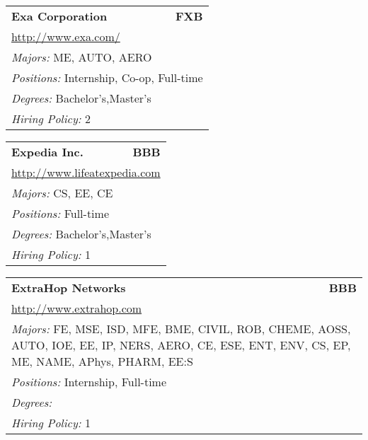 \documentclass[twoside]{article}
\begin{document}
\begin{center}
\begin{multicols}{3}
\begin{FlushLeft}
\begin{minipage}{.9\columnwidth}
\end{minipage}
 
\begin{minipage}{.9\columnwidth}\begin{tabularx}{.95\columnwidth}{Xr}
                 {\Large\bf Exa Corporation} & {\Large\bf FXB}\\
    \multicolumn{2}{p{.95\columnwidth}}{\url{http://www.exa.com/}}\\
    \multicolumn{2}{p{.95\columnwidth}}{\emph{Majors:} ME, AUTO, AERO}\\
    \multicolumn{2}{p{.95\columnwidth}}{\emph{Positions:} Internship, Co-op, Full-time}\\
    \multicolumn{2}{p{.95\columnwidth}}{\emph{Degrees:} Bachelor's,Master's}\\
    \multicolumn{2}{p{.95\columnwidth}}{\emph{Hiring Policy:} 2}\\
    \end{tabularx}
    
\end{minipage}
 
\begin{minipage}{.9\columnwidth}\begin{tabularx}{.95\columnwidth}{Xr}
                 {\Large\bf Expedia Inc.} & {\Large\bf BBB}\\
    \multicolumn{2}{p{.95\columnwidth}}{\url{http://www.lifeatexpedia.com}}\\
    \multicolumn{2}{p{.95\columnwidth}}{\emph{Majors:} CS, EE, CE}\\
    \multicolumn{2}{p{.95\columnwidth}}{\emph{Positions:} Full-time}\\
    \multicolumn{2}{p{.95\columnwidth}}{\emph{Degrees:} Bachelor's,Master's}\\
    \multicolumn{2}{p{.95\columnwidth}}{\emph{Hiring Policy:} 1}\\
    \end{tabularx}
    
\end{minipage}
 
\begin{minipage}{.9\columnwidth}\begin{tabularx}{.95\columnwidth}{Xr}
                 {\Large\bf ExtraHop Networks} & {\Large\bf BBB}\\
    \multicolumn{2}{p{.95\columnwidth}}{\url{http://www.extrahop.com}}\\
    \multicolumn{2}{p{.95\columnwidth}}{\emph{Majors:} FE, MSE, ISD, MFE, BME, CIVIL, ROB, CHEME, AOSS, AUTO, IOE, EE, IP, NERS, AERO, CE, ESE, ENT, ENV, CS, EP, ME, NAME, APhys, PHARM, EE:S}\\
    \multicolumn{2}{p{.95\columnwidth}}{\emph{Positions:} Internship, Full-time}\\
    \multicolumn{2}{p{.95\columnwidth}}{\emph{Degrees:} }\\
    \multicolumn{2}{p{.95\columnwidth}}{\emph{Hiring Policy:} 1}\\
    \end{tabularx}
    

\end{minipage}
\end{FlushLeft}
\end{multicols}
\end{center}
\end{document}
